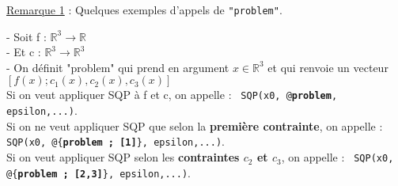 \underline{Remarque 1} : Quelques exemples d'appels de \texttt{"problem"}.\medbreak

- Soit f :  $\mathbb{R}^{3} \rightarrow \mathbb{R}$\\
\indent - Et c : $\mathbb{R}^{3} \rightarrow \mathbb{R}^3$\\
\indent - On définit "problem" qui prend en argument $x \in \mathbb{R}^{3} $ et qui renvoie un vecteur $[f(x);c_1(x),c_2(x),c_3(x)]$\\
Si on veut appliquer SQP à f et c, on appelle :  \texttt{ SQP(x0, @\textbf{problem}, epsilon,...)}.\\
Si on ne veut appliquer SQP que selon la \textbf{première contrainte}, on appelle : \texttt{ SQP(x0, @\{\textbf{problem ; [1]}\}, epsilon,...)}.\\
Si on veut appliquer SQP selon les \textbf{contraintes $c_2$ et $c_3$}, on appelle : \texttt{ SQP(x0, @\{\textbf{problem ; [2,3]}\}, epsilon,...)}.
\bigbreak


